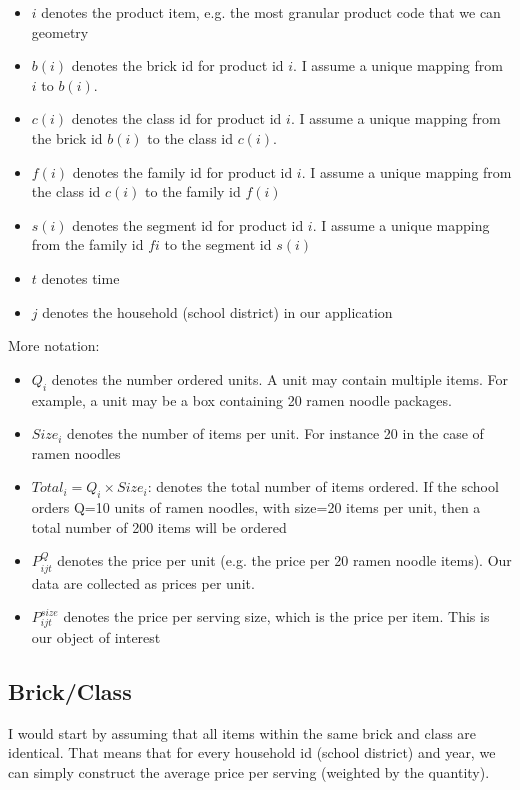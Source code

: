 \documentclass[11pt]{article}
\begin{document}
\begin{itemize}
\item $i$ denotes the product item, e.g. the most granular product code that we can geometry
\item $b(i)$ denotes the brick id for product id $i$. I assume a unique mapping from $i$ to $b(i)$.
\item $c(i)$ denotes the class id for product id $i$. I assume a unique mapping from the brick id $b(i)$ to the class id $c(i)$.
\item $f(i)$ denotes the family id for product id $i$. I assume a unique mapping from the class id $c(i)$ to the family id $f(i)$ 
\item $s(i)$ denotes the segment id for product id $i$. I assume a unique mapping from the family id $fi$ to the segment id $s(i)$
\item $t$ denotes time
\item $j$ denotes the household (school district) in our application
\end{itemize}

More notation:

\begin{itemize}
\item $Q_i$ denotes the number ordered units. A unit may contain multiple items. For example, a unit may be a box containing 20 ramen noodle packages.
\item $Size_i$ denotes the number of items per unit. For instance 20 in the case of ramen noodles
\item $Total_i=Q_i\times Size_i$: denotes the total number of items ordered. If the school orders Q=10 units of ramen noodles, with size=20 items per unit, then a total number of 200 items will be ordered	
\item $P^Q_{ijt}$ denotes the price per unit (e.g. the price per 20 ramen noodle items). Our data are collected as prices per unit.
\item $P^{size}_{ijt}$ denotes the price per serving size, which is the price per item. This is our object of interest
\end{itemize}


\subsection{Brick/Class}

I would start by assuming that all items within the same brick and class are identical. That means that for every household id (school district) and year, we can simply construct the average price per serving (weighted by the quantity).
\end{document}
